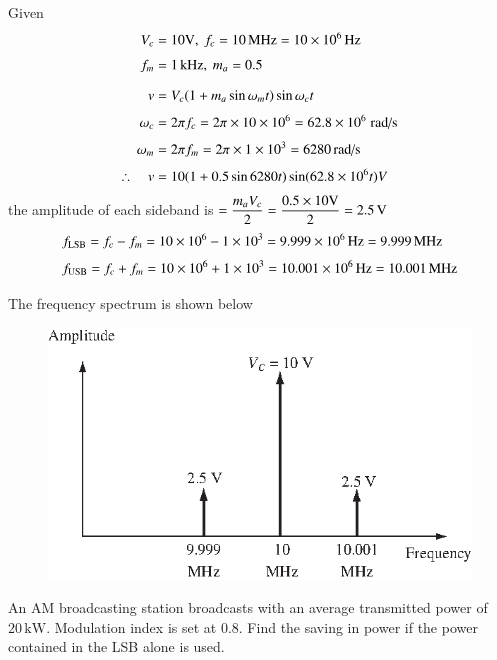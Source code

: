\begin{solution}
Given
\begin{align*}
V_{c} &= 10\text{V}, \ f_{c}=10\text{\,MHz}=10\times 10^{6}\text{\,Hz}\\[3pt]
f_{m} &= 1\text{\,kHz}, \ m_{a}=0.5\\[7pt]
v &= V_{c}(1+m_{a}\sin \omega_{m}t)\sin \omega_{c}t\\[3pt]
\omega_{c} &= 2\pi f_{c}=2\pi \times 10 \times 10^{6}=62.8\times 10^{6}\text{\;rad/s}\\[3pt]
\omega_{m} &= 2\pi f_{m}=2\pi \times 1\times 10^{3}=6280\text{\,rad/s}\\[3pt]
\therefore\quad v &= 10(1+0.5\sin 6280t)\sin (62.8\times 10^{6}t)V
\end{align*}
the amplitude of each sideband is $=\dfrac{m_{a}V_{c}}{2}=\dfrac{0.5\times 10\text{V}}{2}=2.5\text{\,V}$
\begin{align*}
& f_{\text{LSB}}=f_{c}-f_{m}=10\times 10^{6}-1\times 10^{3}=9.999\times 10^{6}\text{\,Hz}=9.999\,\text{MHz}\\[3pt]
& f_{\text{USB}} = f_{c}+f_{m}=10\times 10^{6}+1\times 10^{3}=10.001\times 10^{6}\text{\,Hz}=10.001\,\text{MHz}
\end{align*}

The frequency spectrum is shown below
\begin{figure}[H]
\centering
\includegraphics{chap9/S3-EE-07-IN001.eps}
\end{figure}
\vskip -1cm
\end{solution}

\eject

\begin{example}\label{exam9.12}
An AM broadcasting station broadcasts with an average transmitted power of $20\,\text{kW}$. Modulation index is set at $0.8$. Find the saving in power if the power contained in the LSB alone is used.
\end{example}

